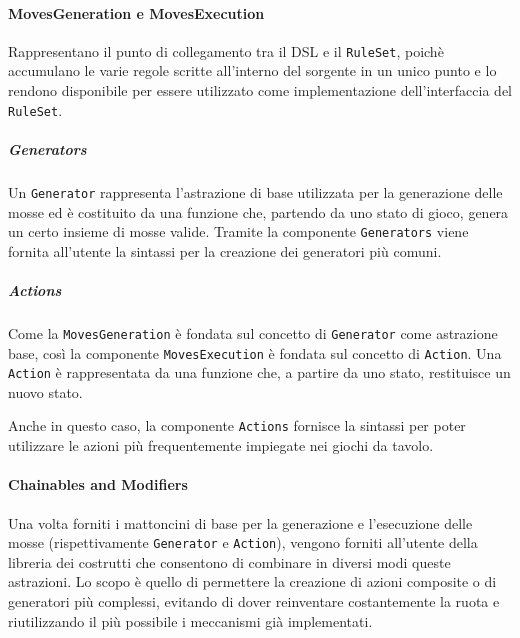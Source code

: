 \paragraph{MovesGeneration e MovesExecution}
Rappresentano il punto di collegamento tra il DSL e il \texttt{RuleSet}, poichè accumulano le varie regole scritte all'interno del sorgente in un unico punto e lo rendono disponibile per essere utilizzato come implementazione dell'interfaccia del \texttt{RuleSet}.

\subparagraph{Generators}
Un \texttt{Generator} rappresenta l'astrazione di base utilizzata per la generazione delle mosse ed è costituito da una funzione che, partendo da uno stato di gioco, genera un certo insieme di mosse valide.
%
Tramite la componente \texttt{Generators} viene fornita all'utente la sintassi per la creazione dei generatori più comuni.

\subparagraph{Actions}
Come la \texttt{MovesGeneration} è fondata sul concetto di \texttt{Generator} come astrazione base, così la componente \texttt{MovesExecution} è fondata sul concetto di \texttt{Action}.
%
Una \texttt{Action} è rappresentata da una funzione che, a partire da uno stato, restituisce un nuovo stato.

Anche in questo caso, la componente \texttt{Actions} fornisce la sintassi per poter utilizzare le azioni più frequentemente impiegate nei giochi da tavolo.

\paragraph{Chainables and Modifiers}
Una volta forniti i mattoncini di base per la generazione e l'esecuzione delle mosse (rispettivamente \texttt{Generator} e \texttt{Action}), vengono forniti all'utente della libreria dei costrutti che consentono di combinare in diversi modi queste astrazioni.
%
Lo scopo è quello di permettere la creazione di azioni composite o di generatori più complessi, evitando di dover reinventare costantemente la ruota e riutilizzando il più possibile i meccanismi già implementati.

